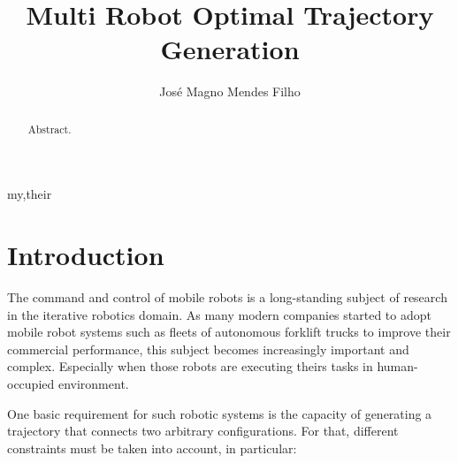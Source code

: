 \documentclass[eprint]{actapoly}
\begin{document}
\title[Trajectory Generation Approach]
{Multi Robot Optimal Trajectory Generation}

\author[J. M. Mendes Filho]{Jos\'{e} Magno Mendes Filho}{my,their}


\begin{abstract}
 Abstract.
\end{abstract}


\maketitle




\section{Introduction}




The command and control of mobile robots is a long-standing subject of research in the iterative robotics domain.
As many modern companies started to adopt mobile robot systems such as fleets of autonomous forklift trucks
to improve their commercial performance,
this subject becomes increasingly important and complex. Especially when those robots are executing theirs tasks in human-occupied environment.



One basic requirement for such robotic systems is the capacity of generating a trajectory that connects two
arbitrary configurations. For that, different constraints must be taken into account, in particular:
\end{document}
